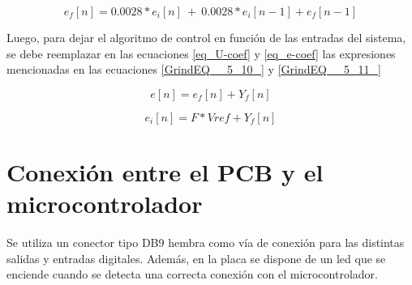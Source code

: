 \begin{equation} \label{eq_e-coef} 
	e_f[n]=0.0028*e_i[n]\ +\ {0.0028*e}_i[n-1]+e_f[n-1] 
\end{equation} 


\noindent Luego, para dejar el algoritmo de control en funci\'{o}n de las entradas del sistema, se debe reemplazar en las ecuaciones \ref{eq_U-coef} y \ref{eq_e-coef} las expresiones mencionadas en las ecuaciones \ref{GrindEQ__5_10_} y \ref{GrindEQ__5_11_}

\begin{equation} \label{GrindEQ__5_10_} 
	e[n]=e_f[n]+Y_f[n] 
\end{equation} 

\begin{equation} \label{GrindEQ__5_11_} 
	e_i[n]=F*Vref+Y_f[n] 
\end{equation} 

\section{Conexi\'{o}n entre el PCB y el microcontrolador}

\noindent Se utiliza un conector tipo DB9 hembra como v\'{i}a de conexi\'{o}n para las distintas salidas y entradas digitales. Adem\'{a}s, en la placa se dispone de un led que se enciende cuando  se detecta una correcta conexi\'{o}n con el microcontrolador.







